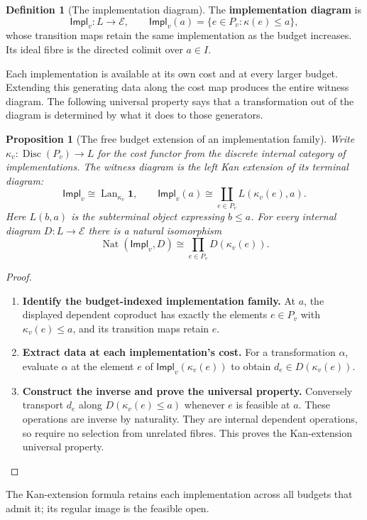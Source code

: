 \documentclass[11pt,a4paper]{article}
\numberwithin{algorithm}{section}
\numberwithin{equation}{section}
\newtheorem{proposition}[proposition]{Proposition}
\theoremstyle{definition}
\newtheorem{definition}[definition]{Definition}
\theoremstyle{remark}
\theoremstyle{plain}
\newcommand{\E}{\mathcal E}
\newcommand{\Lan}{\operatorname{Lan}}
\theoremstyle{definition}
\theoremstyle{plain}
\begin{document}
\begin{definition}[The implementation diagram]\label{def:implementation-diagram}
The \textbf{implementation diagram} is
\[
 \mathsf{Impl}_v:L\to\E,\qquad
 \mathsf{Impl}_v(a)=\{e\in P_v:\kappa(e)\le a\},
\]
whose transition maps retain the same implementation as the budget
increases. Its ideal fibre is the directed colimit over $a\in I$.
\end{definition}


Each implementation is available at its own cost and at every larger
budget. Extending this generating data along the cost map produces
the entire witness diagram. The following universal property says
that a transformation out of the diagram is determined by what it
does to those generators.

\begin{proposition}[The free budget extension of an implementation family]
\label{prop:cat-implementation-kan}
Write $\kappa_v:\operatorname{Disc}(P_v)\to L$ for the cost functor
from the discrete internal category of implementations.  The witness
diagram is the left Kan extension of its terminal diagram:
\[
 \mathsf{Impl}_v\cong\Lan_{\kappa_v}\mathbf1,\qquad
 \mathsf{Impl}_v(a)
   \cong\coprod_{e\in P_v}L(\kappa_v(e),a).
\]
Here $L(b,a)$ is the subterminal object expressing $b\le a$.
For every internal diagram $D:L\to\E$ there is a natural isomorphism
\begin{equation}\label{eq:cat-implementation-kan-property}
 \operatorname{Nat}(\mathsf{Impl}_v,D)
 \cong\prod_{e\in P_v}D(\kappa_v(e)).
\end{equation}
\end{proposition}
\begin{proof}\leavevmode
\begin{enumerate}[leftmargin=*,align=left]
\item \textbf{Identify the budget-indexed implementation family.}
At $a$, the displayed dependent coproduct has exactly the elements
$e\in P_v$ with $\kappa_v(e)\le a$, and its transition maps retain
$e$.

\item \textbf{Extract data at each implementation's cost.}
For a transformation $\alpha$, evaluate $\alpha$ at the element
$e$ of $\mathsf{Impl}_v(\kappa_v(e))$ to obtain
$d_e\in D(\kappa_v(e))$.

\item \textbf{Construct the inverse and prove the universal property.}
Conversely transport $d_e$ along
$D(\kappa_v(e)\le a)$ whenever $e$ is feasible at $a$.
These operations are inverse by naturality.  They are internal
dependent operations, so require no selection from unrelated fibres.
This proves the Kan-extension universal property.
\end{enumerate}
\end{proof}
The Kan-extension formula retains each implementation across all budgets
that admit it; its regular image is the feasible open.
\end{document}
